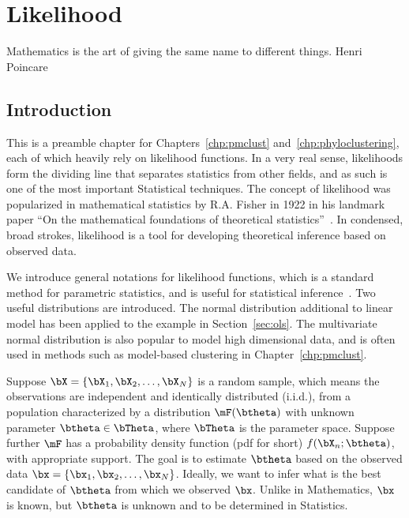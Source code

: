 
\chapter{Likelihood}
\label{chp:likelihood}


\inspire%
{Mathematics is the art of giving the same name to different things.}%
{Henri Poincare}


\section{Introduction}
\label{sec:likelihood_introduction}

This is a preamble chapter for Chapters~\ref{chp:pmclust}
and~\ref{chp:phyloclustering}, each of which heavily rely on
likelihood functions.  In a very real sense, 
likelihoods form the dividing line that separates statistics from other 
fields, and as such is one of the most important Statistical 
techniques.  The concept of likelihood was popularized
in mathematical statistics by R.A. Fisher in 1922 in his landmark paper
``On the mathematical foundations of theoretical
statistics''~\citep{Fisher1922}.
In condensed, broad strokes, likelihood is a tool for developing theoretical 
inference based on observed data.

We introduce general notations for likelihood functions,
which is a standard method for parametric statistics, and is
useful for statistical inference~\citep{Casella2001}.
Two useful distributions are introduced.
The normal distribution additional to linear model has been applied to
the example in Section~\ref{sec:ols}.
The multivariate normal
distribution
is also popular to model high dimensional data, and is often used in methods 
such as model-based clustering in Chapter~\ref{chp:pmclust}.

Suppose $\bX = \{\bX_1, \bX_2, \ldots, \bX_N\}$ is a random sample,
which means the observations are independent and identically distributed
(i.i.d.),
from a population characterized by a distribution $\mF(\btheta)$ with unknown
parameter $\btheta \in \bTheta$, where $\bTheta$ is the parameter space.
Suppose further $\mF$ has a probability density function
(pdf for short)
$f(\bX_n; \btheta)$, with appropriate support.
The goal is to estimate $\btheta$ based on the observed data
$\bx = \{\bx_1, \bx_2, \ldots, \bx_N\}$.
Ideally, we want to infer what is the best candidate of $\btheta$
from which we observed $\bx$.
Unlike in Mathematics, $\bx$ is known, but $\btheta$ is unknown and
to be determined in Statistics.

